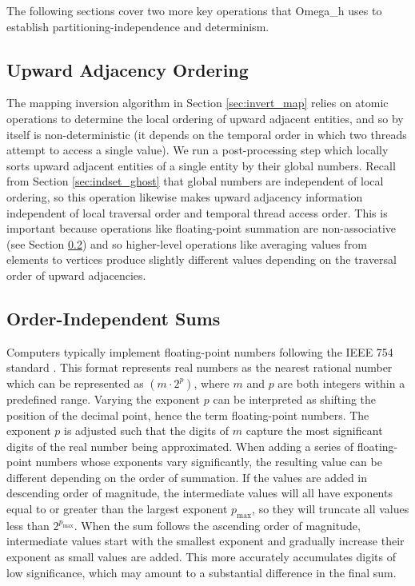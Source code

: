 The following sections cover two more key operations
that Omega\_h uses to establish partitioning-independence
and determinism.

\subsection{Upward Adjacency Ordering}
\label{sec:sort_up}

The mapping inversion algorithm in Section \ref{sec:invert_map}
relies on atomic operations to determine the local ordering
of upward adjacent entities, and so by itself is non-deterministic
(it depends on the temporal order in which two threads attempt to
access a single value).
We run a post-processing step which locally sorts upward adjacent
entities of a single entity by their global numbers.
Recall from Section \ref{sec:indset_ghost} that global numbers
are independent of local ordering, so this operation likewise
makes upward adjacency information independent of local
traversal order and temporal thread access order.
This is important because operations like floating-point summation
are non-associative (see Section \ref{sec:repro_sum})
and so higher-level operations like averaging values from elements
to vertices produce slightly different values depending on the
traversal order of upward adjacencies.

\subsection{Order-Independent Sums}
\label{sec:repro_sum}

Computers typically implement floating-point numbers following the IEEE 754
standard \cite{hennessy2011computer}.
This format represents real numbers as the nearest rational number
which can be represented as $(m\cdot 2^p)$, where $m$ and $p$ are both
integers within a predefined range.
Varying the exponent $p$ can be interpreted as shifting the position of the
decimal point, hence the term floating-point numbers.
The exponent $p$ is adjusted such that the digits of $m$ capture the
most significant digits of the real number being approximated.
When adding a series of floating-point numbers whose exponents
vary significantly, the resulting value can be different
depending on the order of summation.
If the values are added in descending order of magnitude, the intermediate
values will all have exponents equal to or greater than the largest
exponent $p_{\text{max}}$, so they will truncate all values less
than $2^{p_{\text{max}}}$.
When the sum follows the ascending order of magnitude, intermediate
values start with the smallest exponent and gradually increase their
exponent as small values are added.
This more accurately accumulates digits of low significance, which
may amount to a substantial difference in the final sum.

